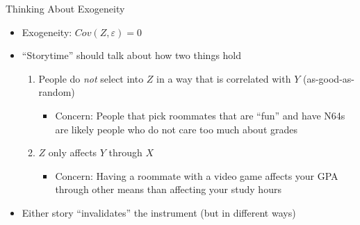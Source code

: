 \documentclass[aspectratio=169,11pt]{beamer}
\begin{document}
\begin{frame}{Thinking About Exogeneity}
\begin{itemize}
\item Exogeneity: $Cov(Z,\varepsilon)= 0$
\medskip
\item ``Storytime'' should talk about how two things hold
\begin{enumerate}
\item People do \emph{not} select into $Z$ in a way that is correlated with $Y$ (as-good-as-random)
\begin{itemize}
\item Concern: People that pick roommates that are ``fun'' and have N64s are likely people who do not care too much about grades
\end{itemize}
\item $Z$ only affects $Y$ through $X$
\begin{itemize}
\item Concern: Having a roommate with a video game affects your GPA through other means than affecting your study hours
\end{itemize}
\end{enumerate}
\medskip
\item Either story ``invalidates'' the instrument (but in different ways)
\end{itemize}
\end{frame}
\end{document}
